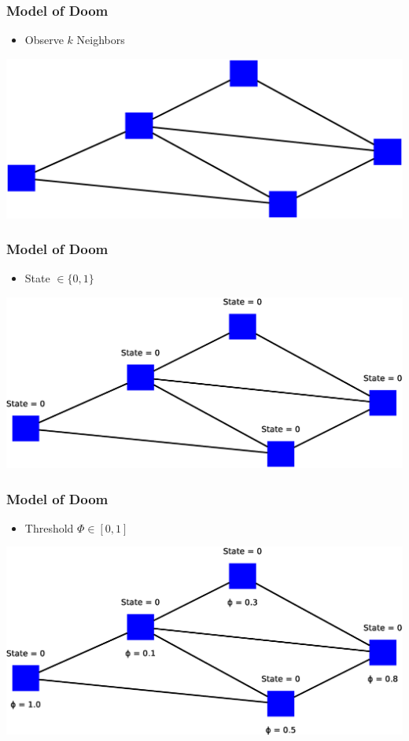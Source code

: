 \documentclass[slidestop,usenames,dvipsnames]{beamer}
\newcommand{\gitem}{\vfill\item}
\begin{document}
\begin{frame}
    \frametitle{Model of Doom}
    \begin{itemize}
        \gitem Observe $k$ Neighbors
    \end{itemize}
    \vfill
    \includegraphics[width=\textwidth]{img/model2}
    \vfill
\end{frame}

\begin{frame}
    \frametitle{Model of Doom}
    \begin{itemize}
        \gitem State $\in \lbrace 0, 1 \rbrace$
    \end{itemize}
    \vfill
    \includegraphics[width=\textwidth]{img/model3}
    \vfill
\end{frame}

\begin{frame}
    \frametitle{Model of Doom}
    \begin{itemize}
        \gitem Threshold $\Phi \in [0, 1]$
    \end{itemize}
    \vfill
    \includegraphics[width=\textwidth]{img/model4}
    \vfill
\end{frame}
\end{document}
